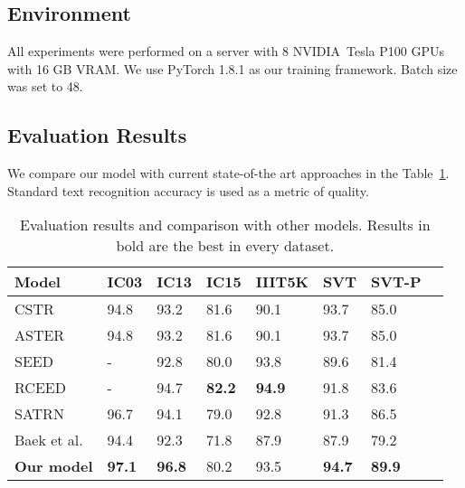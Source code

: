 \documentclass[runningheads]{llncs}
\begin{document}
\subsection{Environment}
All experiments were performed on a server with 8 NVIDIA\textregistered\ Tesla P100 GPUs with 16 GB VRAM. We
use PyTorch 1.8.1 as our training framework. Batch size was set to 48.

\subsection{Evaluation Results}
We compare our model with current state-of-the art approaches in the Table~\ref{table:evaluation}.
Standard text recognition accuracy is used as a metric of quality.

\begin{table}[ht]
  \centering
  \caption{Evaluation results and comparison with other models.
    Results in bold are the best in every dataset.}
  \begin{tabular}{|l|l|l|l|l|l|l|l|}
    \hline
    Model                                     & IC03          & IC13          & IC15          & IIIT5K        & SVT           & SVT-P         \\
    \hline
    CSTR \cite{cstr}                          & 94.8          & 93.2          & 81.6          & 90.1          & 93.7          & 85.0          \\
    ASTER \cite{aster}                        & 94.8          & 93.2          & 81.6          & 90.1          & 93.7          & 85.0          \\
    SEED \cite{qiao2020seed}                  & -             & 92.8          & 80.0          & 93.8          & 89.6          & 81.4          \\
    RCEED \cite{cui2021representation}        & -             & 94.7          & \textbf{82.2} & \textbf{94.9} & 91.8          & 83.6          \\
    SATRN \cite{lee2020satrn}                 & 96.7          & 94.1          & 79.0          & 92.8          & 91.3          & 86.5          \\
    Baek et al. \cite{baek2019STRcomparisons} & 94.4          & 92.3          & 71.8          & 87.9          & 87.9          & 79.2          \\
    \textbf{Our model}                        & \textbf{97.1} & \textbf{96.8} & 80.2          & 93.5          & \textbf{94.7} & \textbf{89.9} \\ [1ex] \hline
  \end{tabular}

  \label{table:evaluation}
\end{table}
\end{document}
